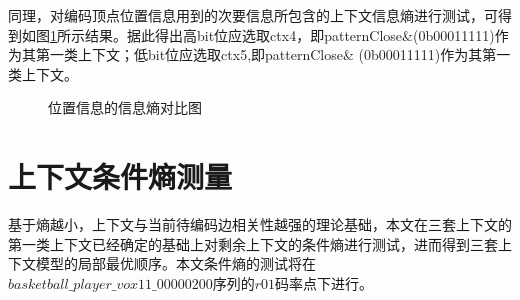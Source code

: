 \documentclass[bachelor,print,msfonts]{xduthesis}
\begin{document}
同理，对编码顶点位置信息用到的次要信息所包含的上下文信息熵进行测试，可得到如图\ref{fig:位置信息上下文的信息对比图}所示结果。据此得出高bit位应选取ctx4，即patternClose\&(0b00011111)作为其第一类上下文；低bit位应选取ctx5,即patternClose\& (0b00011111)作为其第一类上下文。
\begin{figure}[h]
    \centering
    \hspace{0.1in}
    \caption{位置信息的信息熵对比图}
    \label{fig:位置信息上下文的信息对比图}
\end{figure}
\section{上下文条件熵测量}
基于熵越小，上下文与当前待编码边相关性越强的理论基础，本文在三套上下文的第一类上下文已经确定的基础上对剩余上下文的条件熵进行测试，进而得到三套上下文模型的局部最优顺序。本文条件熵的测试将在$basketball\_player\_vox11\_00000200$序列的$r01$码率点下进行。
\end{document}
